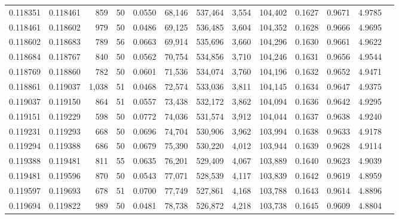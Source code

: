 \begin{tabular}{rrrrrrrrrrrrr}
0.118351 & 0.118461 &   859 &  50 &                                     0.0550 &  68,146 & 537,464 &   3,554 & 104,402 & 0.1627 & 0.9671 & 4.9785 \\
0.118461 & 0.118602 &   979 &  50 &                                     0.0486 &  69,125 & 536,485 &   3,604 & 104,352 & 0.1628 & 0.9666 & 4.9695 \\
0.118602 & 0.118683 &   789 &  56 &                                     0.0663 &  69,914 & 535,696 &   3,660 & 104,296 & 0.1630 & 0.9661 & 4.9622 \\
0.118684 & 0.118767 &   840 &  50 &                                     0.0562 &  70,754 & 534,856 &   3,710 & 104,246 & 0.1631 & 0.9656 & 4.9544 \\
0.118769 & 0.118860 &   782 &  50 &                                     0.0601 &  71,536 & 534,074 &   3,760 & 104,196 & 0.1632 & 0.9652 & 4.9471 \\
0.118861 & 0.119037 & 1,038 &  51 &                                     0.0468 &  72,574 & 533,036 &   3,811 & 104,145 & 0.1634 & 0.9647 & 4.9375 \\
0.119037 & 0.119150 &   864 &  51 &                                     0.0557 &  73,438 & 532,172 &   3,862 & 104,094 & 0.1636 & 0.9642 & 4.9295 \\
0.119151 & 0.119229 &   598 &  50 &                                     0.0772 &  74,036 & 531,574 &   3,912 & 104,044 & 0.1637 & 0.9638 & 4.9240 \\
0.119231 & 0.119293 &   668 &  50 &                                     0.0696 &  74,704 & 530,906 &   3,962 & 103,994 & 0.1638 & 0.9633 & 4.9178 \\
0.119294 & 0.119388 &   686 &  50 &                                     0.0679 &  75,390 & 530,220 &   4,012 & 103,944 & 0.1639 & 0.9628 & 4.9114 \\
0.119388 & 0.119481 &   811 &  55 &                                     0.0635 &  76,201 & 529,409 &   4,067 & 103,889 & 0.1640 & 0.9623 & 4.9039 \\
0.119481 & 0.119596 &   870 &  50 &                                     0.0543 &  77,071 & 528,539 &   4,117 & 103,839 & 0.1642 & 0.9619 & 4.8959 \\
0.119597 & 0.119693 &   678 &  51 &                                     0.0700 &  77,749 & 527,861 &   4,168 & 103,788 & 0.1643 & 0.9614 & 4.8896 \\
0.119694 & 0.119822 &   989 &  50 &                                     0.0481 &  78,738 & 526,872 &   4,218 & 103,738 & 0.1645 & 0.9609 & 4.8804 \\

\end{tabular}
